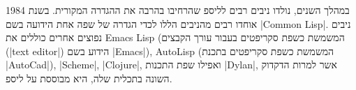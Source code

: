במהלך השנים, נולדו ניבים רבים לליספ שהרחיבו בהרבה את ההגדרה המקורית. בשנת 1984
אוחדו רבים מהניבים הללו לכדי הגדרה של שפה אחת הידועה בשם \E|Common Lisp|. ניבים
נפוצים אחרים כוללים את Emacs Lisp (המשמשת כשפת סקריפטים בעבור עורך הקבצים
(\E|text editor|) הידוע בשם \E|Emacs|), AutoLisp (המשמשת כשפת סקריפטים בתכנת
\E|AutoCad|), \E|Scheme|, \E|Clojure|, ואפילו שפת התכנות \E|Dylan|, אשר למרות
הדקדוק השונה בתכלית שלה, היא מבוססת על ליספ.

%
%
%
%
%
%
